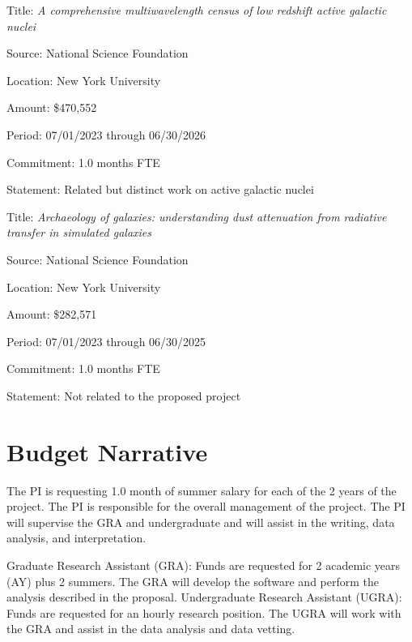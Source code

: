 \documentclass[12pt, preprint]{hacked-aastex}
\begin{document}
\begin{itemize*}
\item[]{Title: {\em A comprehensive multiwavelength census of low
    redshift active galactic nuclei}}
\item[]{Source: National Science Foundation}
\item[]{Location: New York University}
\item[]{Amount: \$470,552}
\item[]{Period: 07/01/2023 through 06/30/2026}
\item[]{Commitment: 1.0 months FTE}
\item[]{Statement: Related but distinct work on active galactic
  nuclei}
\end{itemize*}

\begin{itemize*}
\item[]{Title: {\em Archaeology of galaxies: understanding dust
    attenuation from radiative transfer in simulated galaxies}}
\item[]{Source: National Science Foundation}
\item[]{Location: New York University}
\item[]{Amount: \$282,571}
\item[]{Period: 07/01/2023 through 06/30/2025}
\item[]{Commitment: 1.0 months FTE}
\item[]{Statement: Not related to the proposed project}
\end{itemize*}

\clearpage
\section{Budget Narrative}\label{sec:budget}

 The PI is requesting 1.0 month of
summer salary for each of the 2 years of the project.  The PI is
responsible for the overall management of the project. The PI will
supervise the GRA and undergraduate and will assist in the writing,
data analysis, and interpretation.

 Graduate Research Assistant (GRA):
Funds are requested for 2 academic years (AY) plus 2 summers. The GRA
will develop the software and perform the analysis described in the
proposal. Undergraduate Research Assistant (UGRA): Funds are requested
for an hourly research position. The UGRA will work with the GRA and
assist in the data analysis and data vetting.
\end{document}
